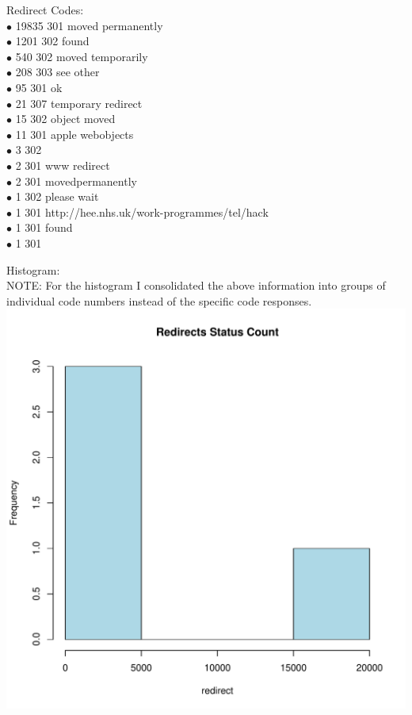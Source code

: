 \documentclass[12pt]{report}
\begin{document}
Redirect Codes:\\
$\bullet$  19835 301 moved permanently\\
$\bullet$   1201 302 found\\
$\bullet$    540 302 moved temporarily\\
$\bullet$    208 303 see other\\
$\bullet$     95 301 ok\\
$\bullet$     21 307 temporary redirect\\
$\bullet$     15 302 object moved\\
$\bullet$     11 301 apple webobjects\\
$\bullet$      3 302\\
$\bullet$      2 301 www redirect\\
$\bullet$      2 301 movedpermanently\\
$\bullet$      1 302 please wait\\
$\bullet$      1 301 http://hee.nhs.uk/work-programmes/tel/hack\\
$\bullet$      1 301 found\\
$\bullet$      1 301

Histogram:\\
NOTE: For the histogram I consolidated the above information into groups of individual code numbers instead of the specific code responses.\\
\includegraphics{redirectsPlot.pdf}
\end{document}
